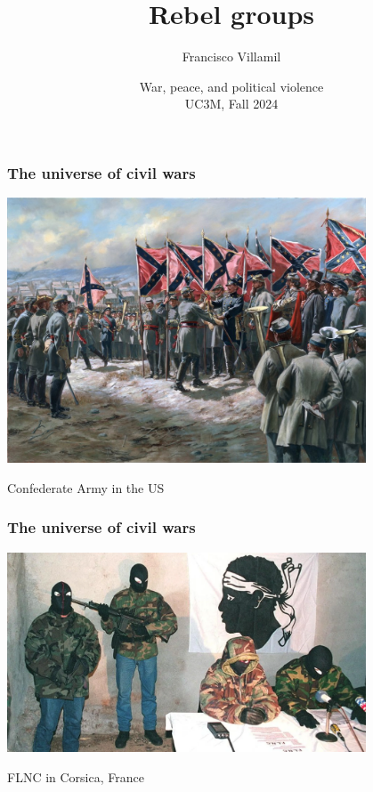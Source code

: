 \documentclass[aspectratio=43]{beamer}
\title{\huge Rebel groups}
\author{Francisco Villamil}
\date{War, peace, and political violence\\UC3M, Fall 2024}
\begin{document}
\begin{frame}
  \titlepage
\end{frame}

\begin{frame}
\frametitle{The universe of civil wars}
\centering

\includegraphics[width = 0.8\textwidth]{img/confederate}

\vspace{15pt}

Confederate Army in the US

\end{frame}

%
%
%
%

\begin{frame}
\frametitle{The universe of civil wars}
\centering

\includegraphics[width = 0.8\textwidth]{img/flnc}

FLNC in Corsica, France

\end{frame}
\end{document}
